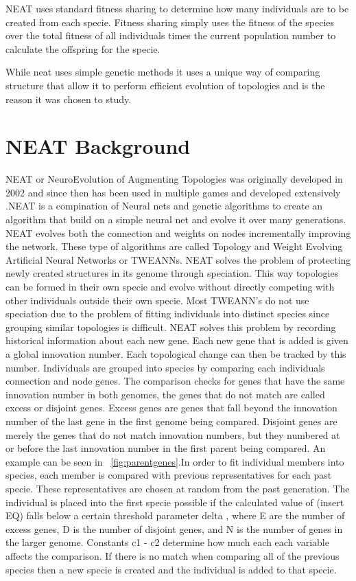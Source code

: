 \documentclass[12pt]{ucthesis} \newif\ifpdf \ifx\pdfoutput\undefined
\begin{document}
NEAT uses standard fitness sharing to determine how many individuals are to be
created from each specie. Fitness sharing simply uses the fitness of the species
over the total fitness of all individuals times the current population number to
calculate the offspring for the specie.

While neat uses simple genetic methods it uses a unique way of comparing
structure that allow it to perform efficient evolution of topologies and is the
reason it was chosen to study.

\section{NEAT Background}

NEAT or NeuroEvolution of Augmenting Topologies  was originally developed in
2002 and since then has been used in multiple games and developed extensively
\cite{stanley:phd04}.NEAT is a compination of Neural nets and genetic algorithms
to create an algorithm that build on a simple neural net and evolve it over many
generations. NEAT evolves both the connection and weights on nodes incrementally
improving the network. These type of algorithms are called Topology and Weight
Evolving Artiﬁcial Neural Networks or TWEANNs. NEAT solves the problem of
protecting newly created structures in its genome through speciation. This way
topologies can be formed in their own specie and evolve without directly
competing with other individuals outside their own specie. Most TWEANN’s do not
use speciation due to the problem of fitting individuals into distinct species
since grouping similar topologies is difficult. NEAT solves this problem by
recording historical information about each new gene. Each new gene that is
added is given a global innovation number. Each topological change can then be
tracked by this number. Individuals are grouped into species by comparing each
individuals connection and node genes. The comparison checks for genes that have
the same innovation number in both genomes, the genes that do not match are
called excess or disjoint genes. Excess genes are genes that fall beyond the
innovation number of the last gene in the first genome being compared. Disjoint
genes are merely the genes that do not match innovation numbers, but they
numbered at or before the last innovation number in the first parent being
compared. An example can be seen in  ~\ref{fig:parentgenes}.In order to fit
individual members into species, each member is compared with previous
representatives for each past specie. These representatives are chosen at random
from the past generation. The individual is placed into the first specie
possible if the calculated value of (insert EQ) falls below a certain threshold
parameter delta , where E are the number of excess genes, D is the number of
disjoint genes, and N is the number of genes in the larger genome. Constants c1
- c2 determine how much each each variable affects the comparison. If there is
no match when comparing all of the previous species then a new specie is created
and the individual is added to that specie.
\end{document}
